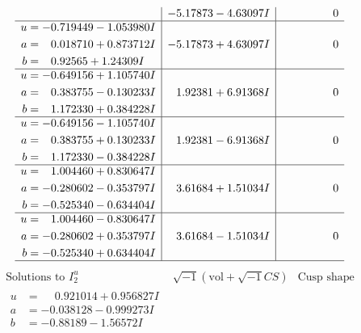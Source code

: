 \documentclass[1p]{elsarticle_modified}
\theoremstyle{definition}
\newcommand{\I}{\sqrt{-1}}
\begin{document}
$$\begin{array}{c|c|c}
 & -5.17873 - 4.63097 I & \phantom{-0.000000 } 0 \\ \hline\begin{aligned}
u &= -0.719449 - 1.053980 I \\
a &= \phantom{-}0.018710 + 0.873712 I \\
b &= \phantom{-}0.92565 + 1.24309 I\end{aligned}
 & -5.17873 + 4.63097 I & \phantom{-0.000000 } 0 \\ \hline\begin{aligned}
u &= -0.649156 + 1.105740 I \\
a &= \phantom{-}0.383755 - 0.130233 I \\
b &= \phantom{-}1.172330 + 0.384228 I\end{aligned}
 & \phantom{-}1.92381 + 6.91368 I & \phantom{-0.000000 } 0 \\ \hline\begin{aligned}
u &= -0.649156 - 1.105740 I \\
a &= \phantom{-}0.383755 + 0.130233 I \\
b &= \phantom{-}1.172330 - 0.384228 I\end{aligned}
 & \phantom{-}1.92381 - 6.91368 I & \phantom{-0.000000 } 0 \\ \hline\begin{aligned}
u &= \phantom{-}1.004460 + 0.830647 I \\
a &= -0.280602 - 0.353797 I \\
b &= -0.525340 - 0.634404 I\end{aligned}
 & \phantom{-}3.61684 + 1.51034 I & \phantom{-0.000000 } 0 \\ \hline\begin{aligned}
u &= \phantom{-}1.004460 - 0.830647 I \\
a &= -0.280602 + 0.353797 I \\
b &= -0.525340 + 0.634404 I\end{aligned}
 & \phantom{-}3.61684 - 1.51034 I & \phantom{-0.000000 } 0\\
 \hline 
 \end{array}$$\newpage$$\begin{array}{c|c|c}  
\text{Solutions to }I^u_{2}& \I (\text{vol} + \sqrt{-1}CS) & \text{Cusp shape}\\
 \hline 
\begin{aligned}
u &= \phantom{-}0.921014 + 0.956827 I \\
a &= -0.038128 - 0.999273 I \\
b &= -0.88189 - 1.56572 I\end{aligned}

\end{array}$$
\end{document}
